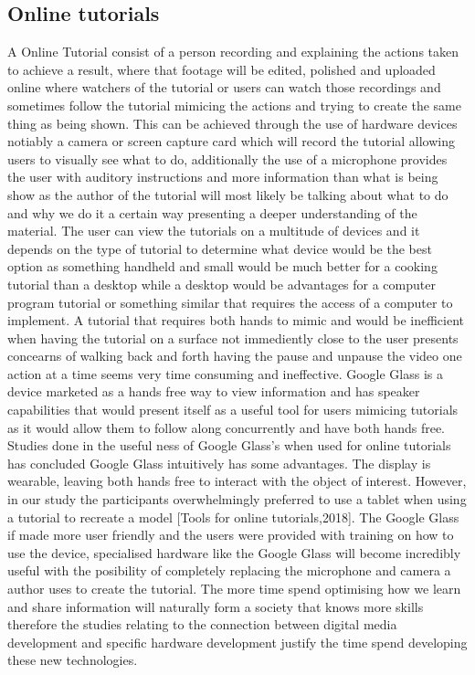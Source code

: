 \documentclass[12pt, times new roman]{article}
\begin{document}
\subsection{Online tutorials}
A Online Tutorial consist of a person recording and explaining the actions taken to achieve a result, where that footage will be edited, polished and uploaded online where watchers of the tutorial or users can watch those recordings and sometimes follow the tutorial mimicing the actions and trying to create the same thing as being shown. This can be achieved through the use of hardware devices notiably a camera or screen capture card which will record the tutorial allowing users to visually see what to do, additionally the use of a microphone provides the user with auditory instructions and more information than what is being show as the author of the tutorial will most likely be talking about what to do and why we do it a certain way presenting a deeper understanding of the material. The user can view the tutorials on a multitude of devices and it depends on the type of tutorial to determine what device would be the best option as something handheld and small would be much better for a cooking tutorial than a desktop while a desktop would be advantages for a computer program tutorial or something similar that requires the access of a computer to implement.  \newline 
A tutorial that requires both hands to mimic and would be inefficient when having the tutorial on a surface not immediently close to the user presents concearns of walking back and forth having the pause and unpause the video one action at a time seems very time consuming and ineffective. Google Glass is a device marketed as a hands free way to view information and has speaker capabilities that would present itself as a useful tool for users mimicing tutorials as it would allow them to follow along concurrently and have both hands free. Studies done in the useful ness of Google Glass's when used for online tutorials has concluded Google Glass intuitively has some advantages. The display is wearable, leaving both hands free to interact with the object of interest. However, in our study the participants overwhelmingly preferred to use a tablet when using a tutorial to recreate a model [Tools for online tutorials,2018]. The Google Glass if made more user friendly and the users were provided with training on how to use the device, specialised hardware like the Google Glass will become incredibly useful with the posibility of completely replacing the microphone and camera a author uses to create the tutorial. The more time spend optimising how we learn and share information will naturally form a society that knows more skills therefore the studies relating to the connection between digital media development and specific hardware development justify the time spend developing these new technologies.  \newline
\end{document}
